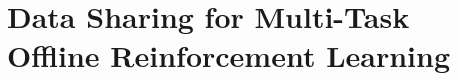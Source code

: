 \documentclass[../thesis.tex]{subfiles}
\begin{document}

\vspace{-0.2cm}
\section{Data Sharing for Multi-Task Offline Reinforcement Learning}    
\label{sec:cds_section}
\vspace{-0.2cm}

% 








    
\end{document}
